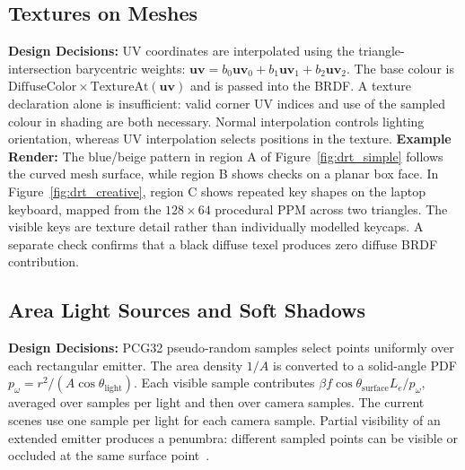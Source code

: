 \documentclass[11pt,a4paper]{article}
\begin{document}
\subsection{Textures on Meshes}
\textbf{Design Decisions:} UV coordinates are interpolated using the triangle-intersection barycentric weights: $\mathbf{uv}=b_0\mathbf{uv}_0+b_1\mathbf{uv}_1+b_2\mathbf{uv}_2$. The base colour is \(\text{DiffuseColor}\times\text{TextureAt}(\mathbf{uv})\) and is passed into the BRDF. A texture declaration alone is insufficient: valid corner UV indices and use of the sampled colour in shading are both necessary. Normal interpolation controls lighting orientation, whereas UV interpolation selects positions in the texture.
\textbf{Example Render:}
The blue/beige pattern in region A of Figure~\ref{fig:drt_simple} follows the curved mesh surface, while region B shows checks on a planar box face. In Figure~\ref{fig:drt_creative}, region C shows repeated key shapes on the laptop keyboard, mapped from the $128\times64$ procedural PPM across two triangles. The visible keys are texture detail rather than individually modelled keycaps. A separate check confirms that a black diffuse texel produces zero diffuse BRDF contribution.

\subsection{Area Light Sources and Soft Shadows}
\textbf{Design Decisions:} PCG32 pseudo-random samples select points uniformly over each rectangular emitter. The area density $1/A$ is converted to a solid-angle PDF \(p_\omega=r^2/(A\cos\theta_{\mathrm{light}})\). Each visible sample contributes \(\beta f\cos\theta_{\mathrm{surface}}L_e/p_\omega\), averaged over samples per light and then over camera samples. The current scenes use one sample per light for each camera sample. Partial visibility of an extended emitter produces a penumbra: different sampled points can be visible or occluded at the same surface point~\cite[Part~VI, Sec.~5, pp.~7--8]{cgr-notes}.
\end{document}
